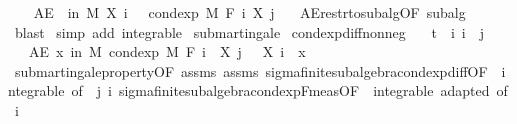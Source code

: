 \begin{isabellebody}
\ \ \isamarkupfalse%
\ {\isachardoublequoteopen}AE\ {\isasymxi}\ in\ M{\isachardot}{\kern0pt}\ X\ i\ {\isasymxi}\ {\isacharequal}{\kern0pt}\ cond{\isacharunderscore}{\kern0pt}exp\ M\ {\isacharparenleft}{\kern0pt}F\ i{\isacharparenright}{\kern0pt}\ {\isacharparenleft}{\kern0pt}X\ j{\isacharparenright}{\kern0pt}\ {\isasymxi}{\isachardoublequoteclose}\ \isamarkupfalse%
\ AE{\isacharunderscore}{\kern0pt}restr{\isacharunderscore}{\kern0pt}to{\isacharunderscore}{\kern0pt}subalg{\isacharbrackleft}{\kern0pt}OF\ subalg{\isacharbrackright}{\kern0pt}\ \isamarkupfalse%
\ blast\isanewline
{}\isamarkupfalse%
\ {\isacharparenleft}{\kern0pt}simp\ add{\isacharcolon}{\kern0pt}\ integrable{\isacharparenright}{\kern0pt}%
\endisatagproof
{\isafoldproof}%
%
\isadelimproof
%
\endisadelimproof
%
\isadelimdocument
%
\endisadelimdocument
%
\isatagdocument
%
\isamarkuptrue%
%
\endisatagdocument
{\isafolddocument}%
%
\isadelimdocument
%
\endisadelimdocument
{}\isamarkupfalse%
\ submartingale\isanewline
{}\isanewline
\isanewline
{}\isamarkupfalse%
\ cond{\isacharunderscore}{\kern0pt}exp{\isacharunderscore}{\kern0pt}diff{\isacharunderscore}{\kern0pt}nonneg{\isacharcolon}{\kern0pt}\isanewline
\ \ \ {\isachardoublequoteopen}t\ {\isasymle}\ i{\isachardoublequoteclose}\ {\isachardoublequoteopen}i\ {\isasymle}\ j{\isachardoublequoteclose}\isanewline
\ \ \ {\isachardoublequoteopen}AE\ x\ in\ M{\isachardot}{\kern0pt}\ cond{\isacharunderscore}{\kern0pt}exp\ M\ {\isacharparenleft}{\kern0pt}F\ i{\isacharparenright}{\kern0pt}\ {\isacharparenleft}{\kern0pt}{\isasymlambda}{\isasymxi}{\isachardot}{\kern0pt}\ X\ j\ {\isasymxi}\ {\isacharminus}{\kern0pt}\ X\ i\ {\isasymxi}{\isacharparenright}{\kern0pt}\ x\ {\isasymge}\ {}{\isachardoublequoteclose}\isanewline
%
\isadelimproof
\ \ %
\endisadelimproof
%
\isatagproof
{}\isamarkupfalse%
\ submartingale{\isacharunderscore}{\kern0pt}property{\isacharbrackleft}{\kern0pt}OF\ assms{\isacharbrackright}{\kern0pt}\ assms\ sigma{\isacharunderscore}{\kern0pt}finite{\isacharunderscore}{\kern0pt}subalgebra{\isachardot}{\kern0pt}cond{\isacharunderscore}{\kern0pt}exp{\isacharunderscore}{\kern0pt}diff{\isacharbrackleft}{\kern0pt}OF\ {\isacharunderscore}{\kern0pt}\ integrable{\isacharparenleft}{\kern0pt}{}{\isacharcomma}{\kern0pt}{}{\isacharparenright}{\kern0pt}{\isacharcomma}{\kern0pt}\ of\ {\isacharunderscore}{\kern0pt}\ j\ i{\isacharbrackright}{\kern0pt}\ sigma{\isacharunderscore}{\kern0pt}finite{\isacharunderscore}{\kern0pt}subalgebra{\isachardot}{\kern0pt}cond{\isacharunderscore}{\kern0pt}exp{\isacharunderscore}{\kern0pt}F{\isacharunderscore}{\kern0pt}meas{\isacharbrackleft}{\kern0pt}OF\ {\isacharunderscore}{\kern0pt}\ integrable\ adapted{\isacharcomma}{\kern0pt}\ of\ i{\isacharbrackright}{\kern0pt}\ \isamarkupfalse%

\end{isabellebody}
